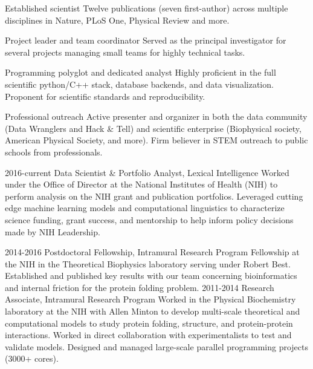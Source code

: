 \documentclass[]{scrartcl}
\begin{document}
\begin{cleanCV}

\vspace{-1em}


\Highlight
{Established scientist}
{Twelve publications (seven first-author) across multiple disciplines in Nature, PLoS One, Physical Review and more.}

\Highlight
{Project leader and team coordinator}
{Served as the principal investigator for several projects managing small teams for highly technical tasks.}

\Highlight
{Programming polyglot and dedicated analyst}
{Highly proficient in the full scientific python/C++ stack, database backends, and data visualization. 
Proponent for scientific standards and reproducibility.}

\Highlight
{Professional outreach}
{Active presenter and organizer in both the data community (Data Wranglers and Hack \& Tell) and scientific enterprise (Biophysical society, American Physical Society, and more). Firm believer in STEM outreach to public schools from professionals.}






\WorkExperience
{2016-current}
{Data Scientist \& Portfolio Analyst, Lexical Intelligence}
{
  Worked under the Office of Director at the National Institutes of Health (NIH) to perform analysis on the NIH grant and publication portfolios. Leveraged cutting edge machine learning models and computational linguistics to characterize science funding, grant success, and mentorship to help inform policy decisions made by NIH Leadership.
}

\WorkExperience
{2014-2016}
{Postdoctoral Fellowship, Intramural Research Program}
{
Fellowship at the NIH in the Theoretical Biophysics laboratory serving under Robert Best.
Established and published key results with our team concerning bioinformatics and internal friction for the protein folding problem.
}
\WorkExperience
{2011-2014}
{Research Associate, Intramural Research Program}
{Worked in the Physical Biochemistry laboratory at the NIH with Allen Minton to develop multi-scale theoretical and computational models to study protein folding, structure, and protein-protein interactions.
Worked in direct collaboration with experimentalists to test and validate models.
Designed and managed large-scale parallel programming projects (3000+ cores).
}


\end{cleanCV}
\end{document}
